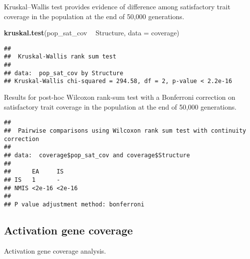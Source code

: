 \documentclass[]{book}
\newenvironment{Shaded}{\begin{snugshade}}{\end{snugshade}}
\newcommand{\DataTypeTok}[1]{\textcolor[rgb]{0.13,0.29,0.53}{#1}}
\newcommand{\KeywordTok}[1]{\textcolor[rgb]{0.13,0.29,0.53}{\textbf{#1}}}
\newcommand{\NormalTok}[1]{#1}
\newcommand{\OperatorTok}[1]{\textcolor[rgb]{0.81,0.36,0.00}{\textbf{#1}}}
\newcommand{\OtherTok}[1]{\textcolor[rgb]{0.56,0.35,0.01}{#1}}
\newcommand{\StringTok}[1]{\textcolor[rgb]{0.31,0.60,0.02}{#1}}
\begin{document}
Kruskal--Wallis test provides evidence of difference among satisfactory trait coverage in the population at the end of 50,000 generations.

\begin{Shaded}
\begin{Highlighting}[]
\KeywordTok{kruskal.test}\NormalTok{(pop_sat_cov }\OperatorTok{~}\StringTok{ }\NormalTok{Structure, }\DataTypeTok{data =}\NormalTok{ coverage)}
\end{Highlighting}
\end{Shaded}

\begin{verbatim}
## 
##  Kruskal-Wallis rank sum test
## 
## data:  pop_sat_cov by Structure
## Kruskal-Wallis chi-squared = 294.58, df = 2, p-value < 2.2e-16
\end{verbatim}

Results for post-hoc Wilcoxon rank-sum test with a Bonferroni correction on satisfactory trait coverage in the population at the end of 50,000 generations.

\begin{Shaded}
\end{Shaded}

\begin{verbatim}
## 
##  Pairwise comparisons using Wilcoxon rank sum test with continuity correction 
## 
## data:  coverage$pop_sat_cov and coverage$Structure 
## 
##      EA     IS    
## IS   1      -     
## NMIS <2e-16 <2e-16
## 
## P value adjustment method: bonferroni
\end{verbatim}

\hypertarget{activation-gene-coverage-13}{%
\subsection{Activation gene coverage}\label{activation-gene-coverage-13}}

Activation gene coverage analysis.
\end{document}
